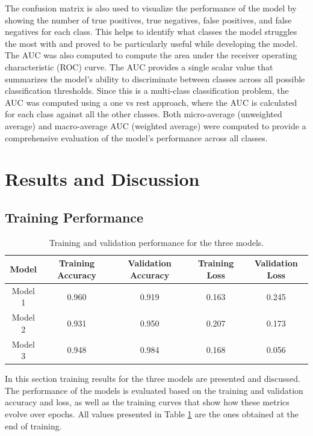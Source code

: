 \documentclass[runningheads]{llncs}
\begin{document}
The confusion matrix is also used to visualize the performance of the model by showing the number of true positives, true negatives, false positives, and false negatives for each class. This helps to identify what classes the model struggles the most with and proved to be particularly useful while developing the model. The AUC was also computed to compute the area under the receiver operating characteristic (ROC) curve. The AUC provides a single scalar value that summarizes the model's ability to discriminate between classes across all possible classification thresholds. Since this is a multi-class classification problem, the AUC was computed using a one vs rest approach, where the AUC is calculated for each class against all the other classes. Both micro-average (unweighted average) and macro-average AUC (weighted average) were computed to provide a comprehensive evaluation of the model's performance across all classes.

\section{Results and Discussion}

\subsection{Training Performance}

\begin{table}
    \centering
    \begin{tabular}{|c|c|c|c|c|}
        \hline
        \textbf{Model} & \textbf{Training Accuracy} & \textbf{Validation Accuracy} & \textbf{Training Loss} & \textbf{Validation Loss} \\
        \hline
        Model 1 & 0.960 & 0.919 & 0.163 & 0.245 \\
        Model 2 & 0.931 & 0.950 & 0.207 & 0.173 \\
        Model 3 & 0.948 & 0.984 & 0.168 & 0.056 \\
        \hline
    \end{tabular}
    \caption{Training and validation performance for the three models.}
    \label{tab:training}
\end{table}

In this section training results for the three models are presented and discussed. The performance of the models is evaluated based on the training and validation accuracy and loss, as well as the training curves that show how these metrics evolve over epochs. All values presented in Table \ref{tab:training} are the ones obtained at the end of training.  
\end{document}
